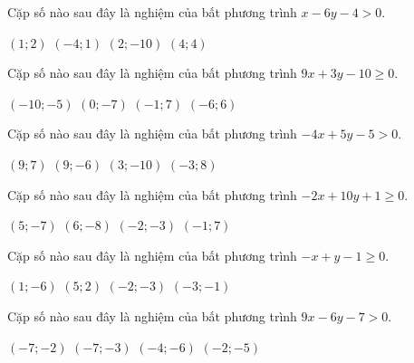 \begin{ex}
 Cặp số nào sau đây là nghiệm của bất phương trình $x - 6 y - 4 > 0$.
 
\choice
{ $(1; 2)$ }
   { $(-4; 1)$ }
     { \True $(2; -10)$ }
    { $(4; 4)$ }
\end{ex}

\begin{ex}
 Cặp số nào sau đây là nghiệm của bất phương trình $9 x + 3 y - 10 \ge 0$.
 
\choice
{ $(-10; -5)$ }
   { $(0; -7)$ }
     { \True $(-1; 7)$ }
    { $(-6; 6)$ }
\end{ex}

\begin{ex}
 Cặp số nào sau đây là nghiệm của bất phương trình $- 4 x + 5 y - 5 > 0$.
 
\choice
{ $(9; 7)$ }
   { $(9; -6)$ }
     { $(3; -10)$ }
    { \True $(-3; 8)$ }
\end{ex}

\begin{ex}
 Cặp số nào sau đây là nghiệm của bất phương trình $- 2 x + 10 y + 1 \ge 0$.
 
\choice
{ $(5; -7)$ }
   { $(6; -8)$ }
     { $(-2; -3)$ }
    { \True $(-1; 7)$ }
\end{ex}

\begin{ex}
 Cặp số nào sau đây là nghiệm của bất phương trình $- x + y - 1 \ge 0$.
 
\choice
{ $(1; -6)$ }
   { $(5; 2)$ }
     { $(-2; -3)$ }
    { \True $(-3; -1)$ }
\end{ex}

\begin{ex}
 Cặp số nào sau đây là nghiệm của bất phương trình $9 x - 6 y - 7 > 0$.
 
\choice
{ $(-7; -2)$ }
   { $(-7; -3)$ }
     { $(-4; -6)$ }
    { \True $(-2; -5)$ }
\end{ex}

